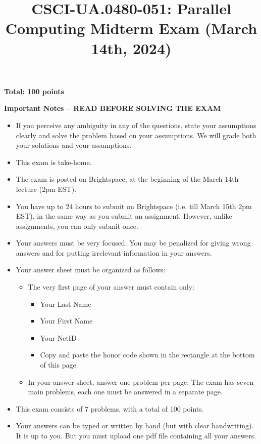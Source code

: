 \documentclass{article}
\title{CSCI-UA.0480-051: Parallel Computing Midterm Exam (March 14th, 2024)}
\author{}
\date{}
\begin{document}
\maketitle

\textbf{Total: 100 points}

\textbf{Important Notes -- READ BEFORE SOLVING THE EXAM}

\begin{itemize}
    \item If you perceive any ambiguity in any of the questions, state your assumptions clearly and solve the problem based on your assumptions. We will grade both your solutions and your assumptions.
    \item This exam is take-home.
    \item The exam is posted on Brightspace, at the beginning of the March 14th lecture (2pm EST).
    \item You have up to 24 hours to submit on Brightspace (i.e. till March 15th 2pm EST), in the same way as you submit an assignment. However, unlike assignments, you can only submit once.
    \item Your answers must be very focused. You may be penalized for giving wrong answers and for putting irrelevant information in your answers.
    \item Your answer sheet must be organized as follows:
    \begin{itemize}
        \item The very first page of your answer must contain only:
        \begin{itemize}
            \item Your Last Name
            \item Your First Name
            \item Your NetID
            \item Copy and paste the honor code shown in the rectangle at the bottom of this page.
        \end{itemize}
        \item In your answer sheet, answer one problem per page. The exam has seven main problems, each one must be answered in a separate page.
    \end{itemize}
    \item This exam consists of 7 problems, with a total of 100 points.
    \item Your answers can be typed or written by hand (but with clear handwriting). It is up to you. But you must upload one pdf file containing all your answers.
\end{itemize}
\end{document}
